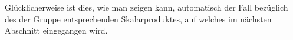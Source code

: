 Glücklicherweise ist dies, wie man zeigen kann, automatisch der Fall bezüglich des der Gruppe entsprechenden Skalarproduktes, 
auf welches im nächsten Abschnitt eingegangen wird.


